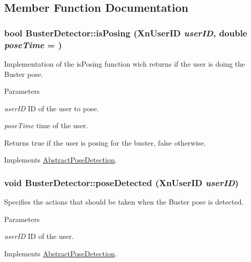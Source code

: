 \subsection{Member Function Documentation}
\hypertarget{classBusterDetector_aa5b294c25df6ace744af596bd708c31c}{
\subsubsection[{isPosing}]{\setlength{\rightskip}{0pt plus 5cm}bool BusterDetector::isPosing (XnUserID {\em userID}, \/  double {\em poseTime} = {})}}
\label{classBusterDetector_aa5b294c25df6ace744af596bd708c31c}
Implementation of the isPosing function wich returns if the user is doing the Buster pose. 
\begin{DoxyParams}{Parameters}
\item[{\em userID}]ID of the user to pose. \item[{\em poseTime}]time of the user. \end{DoxyParams}
\begin{DoxyReturn}{Returns}
true if the user is posing for the buster, false otherwise. 
\end{DoxyReturn}


Implements \hyperlink{classAbstractPoseDetection_ac3343980a1c6b822743b43c4274275e9}{AbstractPoseDetection}.

\hypertarget{classBusterDetector_ac91be6357453deb9e15b3297b6299be3}{
\subsubsection[{poseDetected}]{\setlength{\rightskip}{0pt plus 5cm}void BusterDetector::poseDetected (XnUserID {\em userID})}}
\label{classBusterDetector_ac91be6357453deb9e15b3297b6299be3}
Specifies the actions that should be taken when the Buster pose is detected. 
\begin{DoxyParams}{Parameters}
\item[{\em userID}]ID of the user. \end{DoxyParams}


Implements \hyperlink{classAbstractPoseDetection_a7351e9ac500669934ff823aaf0767076}{AbstractPoseDetection}.

